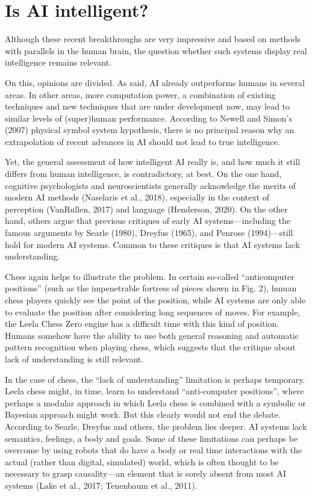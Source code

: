 \section{Is AI intelligent?}

Although these recent breakthroughs are very impressive and based on
methods with parallels in the human brain, the question whether such
systems display real intelligence remains relevant.

On this, opinions are divided.
As said, AI already outperforms humans in several areas.
In other areas, more computation power, a combination of existing
techniques and new techniques that are under development now, may
lead to similar levels of (super)human performance.
According to Newell and Simon's (2007) physical symbol system
hypothesis, there is no principal reason why an extrapolation of
recent advances in AI should not lead to true intelligence.

Yet, the general assessment of how intelligent AI really is, and how
much it still differs from human intelligence, is contradictory,
at best.
On the one hand, cognitive psychologists and neuroscientists generally
acknowledge the merits of modern AI methods (Naselaris et al., 2018),
especially in the context of perception (VanRullen, 2017) and language
(Henderson, 2020).
On the other hand, others argue that previous critiques of early AI
systems---including the famous arguments by Searle (1980),
Dreyfus (1965), and Penrose (1994)---still hold for modern AI systems.
Common to these critiques is that AI systems lack understanding.

Chess again helps to illustrate the problem.
In certain so-called ``anticomputer positions'' (such as the
impenetrable fortress of pieces shown in Fig. 2), human chess players
quickly see the point of the position, while AI systems are only able
to evaluate the position after considering long sequences of moves.
For example, the Leela Chess Zero engine has a difficult time with
this kind of position.
Humans somehow have the ability to use both general reasoning and
automatic pattern recognition when playing chess, which suggests
that the critique about lack of understanding is still relevant.

In the case of chess, the ``lack of understanding'' limitation is
perhaps temporary.
Leela chess might, in time, learn to understand ``anti-computer
positions'', where perhaps a modular approach in which Leela chess
is combined with a symbolic or Bayesian approach might work.
But this clearly would not end the debate.
According to Searle, Dreyfus and others, the problem lies deeper.
AI systems lack semantics, feelings, a body and goals.
Some of these limitations can perhaps be overcome by using robots
that do have a body or real time interactions with the actual
(rather than digital, simulated) world, which is often thought
to be necessary to grasp causality---an element that is sorely
absent from most AI systems
(Lake et al., 2017; Tenenbaum et al., 2011).

